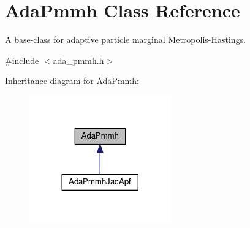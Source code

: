 \hypertarget{classAdaPmmh}{}\section{Ada\+Pmmh Class Reference}
\label{classAdaPmmh}


A base-\/class for adaptive particle marginal Metropolis-\/\+Hastings.  




{\ttfamily \#include $<$ada\+\_\+pmmh.\+h$>$}



Inheritance diagram for Ada\+Pmmh\+:
\nopagebreak
\begin{figure}[H]
\begin{center}
\leavevmode
\includegraphics[width=173pt]{classAdaPmmh__inherit__graph}
\end{center}
\end{figure}
